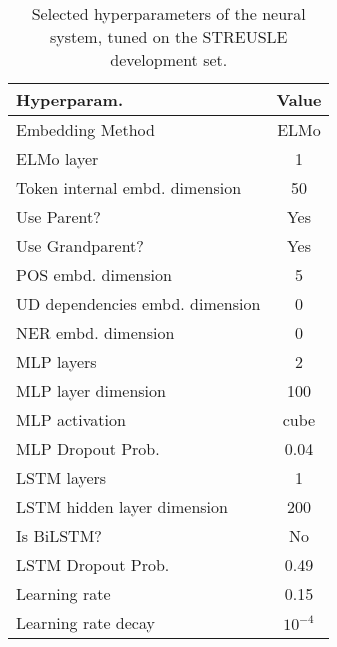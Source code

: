 \begin{table}[]
  \small
	\centering
	\begin{tabular}{@{}l|c@{}}
		\toprule
		Hyperparam. & Value \\
		\midrule
        Embedding Method & ELMo \\
        ELMo layer & 1 \\
        Token internal embd. dimension & 50 \\
        Use Parent? & Yes \\
        Use Grandparent? & Yes \\
        POS embd. dimension  & 5 \\
        UD dependencies embd. dimension  & 0 \\
        NER  embd. dimension  & 0 \\
        MLP layers  & 2 \\
        MLP layer dimension  & 100 \\
        MLP activation  & cube \\
        MLP Dropout Prob.  & 0.04 \\
        LSTM layers  & 1 \\
        LSTM hidden layer dimension  & 200 \\
        Is BiLSTM? & No \\
        LSTM Dropout Prob.  & 0.49 \\
        Learning rate  & 0.15 \\
        Learning rate decay  & $10^{-4}$ \\
		\bottomrule
	\end{tabular}
	\caption{\label{tab:hyperparams}
        Selected hyperparameters of the neural system, tuned on the STREUSLE development set.
	}

\end{table}
